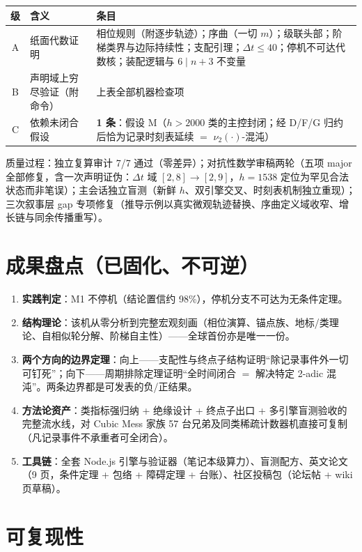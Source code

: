 \documentclass[11pt]{ctexart}
\theoremstyle{definition}
\newcommand{\vtwo}[1]{\nu_2(#1)}
\begin{document}
\begin{table}[h]
\centering\small
\begin{tabular}{clp{7.5cm}}
\toprule
级 & 含义 & 条目\\
\midrule
A & 纸面代数证明 & 相位规则（附逐步轨迹）；序曲（一切 $m$）；级联头部；阶梯类界与边际持续性；支配引理；$\Delta t\le 40$；停机不可达代数核；装配逻辑与 $6\mid n+3$ 不变量\\
B & 声明域上穷尽验证（附命令） & 上表全部机器检查项\\
C & 依赖未闭合假设 & \textbf{1 条}：假设 M（$h>2000$ 类的主控封闭；经 D/F/G 归约后恰为记录时刻表延续 $=$ $\vtwo{\cdot}$-混沌）\\
\bottomrule
\end{tabular}
\end{table}

质量过程：独立复算审计 7/7 通过（零差异）；对抗性数学审稿两轮（五项 major 全部修复，含一次声明证伪：$\Delta t$ 域 $[2,8]\to[2,9]$，$h=1538$ 定位为罕见合法状态而非笔误）；主会话独立盲测（新鲜 $h$、双引擎交叉、时刻表机制独立重现）；三次叙事层 gap 专项修复（推导示例以真实微观轨迹替换、序曲定义域收窄、增长链与同余传播重写）。

\section{成果盘点（已固化、不可逆）}

\begin{enumerate}
\item \textbf{实践判定}：M1 不停机（结论置信约 98\%），停机分支不可达为无条件定理。
\item \textbf{结构理论}：该机从零分析到完整宏观刻画（相位演算、锚点族、地标/类理论、自相似轮分解、阶梯自主性）——全球首份亦是唯一一份。
\item \textbf{两个方向的边界定理}：向上——支配性与终点子结构证明``除记录事件外一切可钉死''；向下——周期排除定理证明``全时间闭合 $=$ 解决特定 2-adic 混沌''。两条边界都是可发表的负/正结果。
\item \textbf{方法论资产}：类指标强归纳 + 绝缘设计 + 终点子出口 + 多引擎盲测验收的完整流水线，对 Cubic Mess 家族 57 台兄弟及同类稀疏计数器机直接可复制（凡记录事件不承重者可全闭合）。
\item \textbf{工具链}：全套 Node.js 引擎与验证器（笔记本级算力）、盲测配方、英文论文（9 页，条件定理 + 包络 + 障碍定理 + 台账）、社区投稿包（论坛帖 + wiki 页草稿）。
\end{enumerate}

\section{可复现性}
\end{document}
